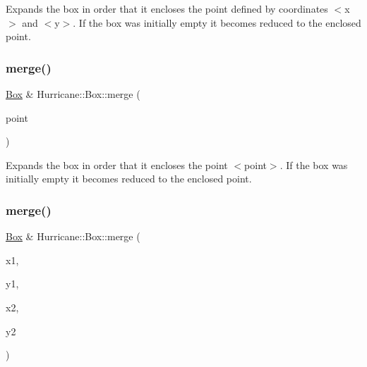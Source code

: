 Expands the box in order that it encloses the point defined by coordinates {\ttfamily $<$x$>$} and {\ttfamily $<$y$>$}. If the box was initially empty it becomes reduced to the enclosed point. \mbox{\label{classHurricane_1_1Box_af1f7dfe8984c2d26fbca78b21358ee2b}} 
\subsubsection{\texorpdfstring{merge()}{merge()}\hspace{0.1cm}{\footnotesize\ttfamily [2/4]}}
{\footnotesize\ttfamily \mbox{\hyperlink{classHurricane_1_1Box}{Box}} \& Hurricane\+::\+Box\+::merge (\begin{DoxyParamCaption}\item[{const \mbox{\hyperlink{classHurricane_1_1Point}{Point}} \&}]{point }\end{DoxyParamCaption})}

Expands the box in order that it encloses the point {\ttfamily $<$point$>$}. If the box was initially empty it becomes reduced to the enclosed point. \mbox{\label{classHurricane_1_1Box_ad97e73e91dd36404eb0dde9d44ff2fd7}} 
\subsubsection{\texorpdfstring{merge()}{merge()}\hspace{0.1cm}{\footnotesize\ttfamily [3/4]}}
{\footnotesize\ttfamily \mbox{\hyperlink{classHurricane_1_1Box}{Box}} \& Hurricane\+::\+Box\+::merge (\begin{DoxyParamCaption}\item[{const \mbox{\hyperlink{group__DbUGroup_ga4fbfa3e8c89347af76c9628ea06c4146}{Db\+U\+::\+Unit}} \&}]{x1,  }\item[{const \mbox{\hyperlink{group__DbUGroup_ga4fbfa3e8c89347af76c9628ea06c4146}{Db\+U\+::\+Unit}} \&}]{y1,  }\item[{const \mbox{\hyperlink{group__DbUGroup_ga4fbfa3e8c89347af76c9628ea06c4146}{Db\+U\+::\+Unit}} \&}]{x2,  }\item[{const \mbox{\hyperlink{group__DbUGroup_ga4fbfa3e8c89347af76c9628ea06c4146}{Db\+U\+::\+Unit}} \&}]{y2 }\end{DoxyParamCaption})}

